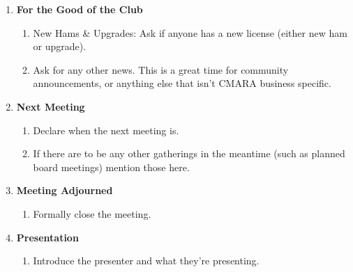 \documentclass[10pt,letterpaper]{article}
\begin{document}
\begin{enumerate}
  \item \textbf{For the Good of the Club}
  \begin{enumerate}
    \item New Hams \& Upgrades: Ask if anyone has a new license (either new ham or upgrade).
    \item Ask for any other news. This is a great time for community announcements, or anything else that isn't CMARA business specific.
  \end{enumerate}

  \item \textbf{Next Meeting}
  \begin{enumerate}
    \item Declare when the next meeting is.
    \item If there are to be any other gatherings in the meantime (such as planned board meetings) mention those here.
  \end{enumerate}

  \item \textbf{Meeting Adjourned}
  \begin{enumerate}
    \item Formally close the meeting.
  \end{enumerate}

  \item \textbf{Presentation}
  \begin{enumerate}
    \item Introduce the presenter and what they're presenting.
  \end{enumerate}

\end{enumerate}
\end{document}
